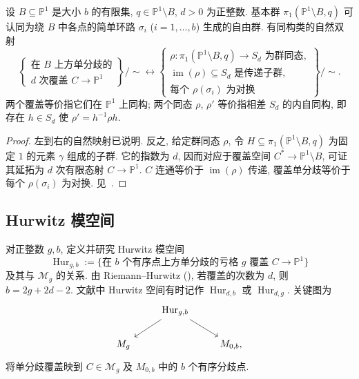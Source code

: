 \begin{proposition}\label{src:6.7.9}
设 $B\subseteq\mathbb P^1$ 是大小 $b$ 的有限集, $q\in\mathbb P^1\setminus B$, $d>0$ 为正整数. 基本群 $\pi_1(\mathbb P^1\setminus B,\allowbreak q)$ 可认同为绕 $B$ 中各点的简单环路 $\sigma_i$ ($i=1,\allowbreak \ldots,\allowbreak b$) 生成的自由群. 有同构类的自然双射
\[
\left\{\begin{array}{l}\text{在 }B\text{ 上方单分歧的}\\d\text{ 次覆盖 }C\to\mathbb P^1\end{array}\right\}/{\sim}
\longleftrightarrow
\left\{\begin{array}{l}\rho:\pi_1(\mathbb P^1\setminus B,q)\to S_d\text{ 为群同态},\\\operatorname{im}(\rho)\subseteq S_d\text{ 是传递子群},\\\text{每个 }\rho(\sigma_i)\text{ 为对换}\end{array}\right\}/{\sim}.
\]
两个覆盖等价指它们在 $\mathbb P^1$ 上同构; 两个同态 $\rho$, $\rho'$ 等价指相差 $S_d$ 的内自同构, 即存在 $h\in S_d$ 使 $\rho'=h^{-1}\rho h$.
\end{proposition}
\begin{proof}
左到右的自然映射已说明. 反之, 给定群同态 $\rho$, 令 $H\subseteq\pi_1(\mathbb P^1\setminus B,\allowbreak q)$ 为固定 $1$ 的元素 $\gamma$ 组成的子群. 它的指数为 $d$, 因而对应于覆盖空间 $C^*\to\mathbb P^1\setminus B$, 可证其延拓为 $d$ 次有限态射 $C\to\mathbb P^1$. $C$ 连通等价于 $\operatorname{im}(\rho)$ 传递, 覆盖单分歧等价于每个 $\rho(\sigma_i)$ 为对换. 见~\cite[命题 III.4.9]{Mir95}.
\end{proof}
\subsection{Hurwitz 模空间}\label{src:6.7.2-subsection}
对正整数 $g,\allowbreak b$, 定义并研究 Hurwitz 模空间
\[
\operatorname{Hur}_{g,b}:=\{\text{在 }b\text{ 个有序点上方单分歧的亏格 }g\text{ 覆盖 }C\to\mathbb P^1\}
\]
及其与 $\mathcal M_g$ 的关系. 由 Riemann--Hurwitz (), 若覆盖的次数为 $d$, 则 $b=2g+2d-2$. 文献中 Hurwitz 空间有时记作 $\operatorname{Hur}_{d,\allowbreak b}$ 或 $\operatorname{Hur}_{d,\allowbreak g}$. 关键图为
\begin{equation}\label{src:6.7.10}
\begin{tikzcd}
&\operatorname{Hur}_{g,b}\arrow[dl]\arrow[dr]&\\
\mathcal M_g&&M_{0,b},
\end{tikzcd}
\end{equation}
将单分歧覆盖映到 $C\in\mathcal M_g$ 及 $M_{0,\allowbreak b}$ 中的 $b$ 个有序分歧点.

